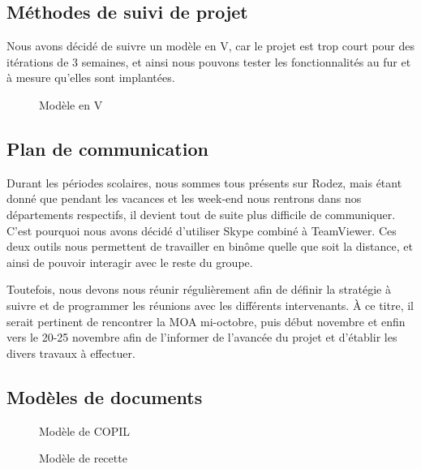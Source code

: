 \documentclass[11pt]{report}
\begin{document}
\subsection{Méthodes de suivi de projet}
Nous avons décidé de suivre un modèle en V, car le projet est trop court pour 
des itérations de 3 semaines, et ainsi nous pouvons tester les fonctionnalités 
au fur et à mesure qu'elles sont implantées.
\begin{figure}[htp] 
\caption{Modèle en V}
\end{figure}

\subsection{Plan de communication}
Durant les périodes scolaires, nous sommes tous présents sur Rodez, mais étant 
donné que pendant les vacances et les week-end nous rentrons dans nos 
départements respectifs, il devient tout de suite plus difficile de communiquer.
C'est pourquoi nous avons décidé d'utiliser Skype combiné à TeamViewer. Ces 
deux outils nous permettent de travailler en binôme quelle que soit la 
distance, 
et ainsi de pouvoir interagir avec le reste du groupe.\\
\par Toutefois, nous devons nous réunir régulièrement afin de définir la 
stratégie à suivre et de programmer les réunions avec les différents 
intervenants. À ce titre, il serait pertinent de rencontrer la MOA mi-octobre, 
puis début novembre et enfin vers le 20-25 novembre afin de l'informer 
de l’avancée du projet et d'établir les divers travaux à effectuer.
\newpage

\subsection{Modèles de documents}
\begin{figure}[htp] \centering{
}
\caption{Modèle de COPIL}
\end{figure}
\newpage
\begin{figure}[htp] \centering{
}
\caption{Modèle de recette}
\end{figure}
\newpage
\end{document}
